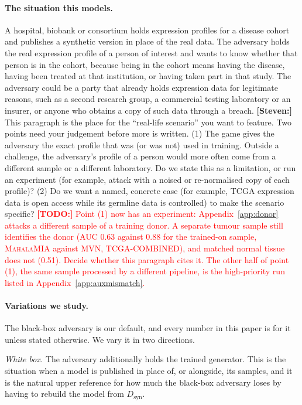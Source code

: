 \documentclass[webpdf,contemporary,large]{oup-authoring-template}
\newif\ifdraft \drafttrue
\newcommand{\annot}[3]{\ifdraft\textcolor{#1}{\textbf{[#2:]} #3}\fi}
\newcommand{\steven}[1]{\annot{Periwinkle}{Steven}{#1}}
\newcommand{\todo}[1]{\annot{red}{TODO}{#1}}
\newcommand{\Dsyn}{D_{\mathrm{syn}}}
\newcommand{\mahala}{\textsc{MahalaMIA}}
\begin{document}
\paragraph{The situation this models.}
A hospital, biobank or consortium holds expression profiles for a disease cohort and publishes a synthetic version in place of the real data. The adversary holds the real expression profile of a person of interest and wants to know whether that person is in the cohort, because being in the cohort means having the disease, having been treated at that institution, or having taken part in that study. The adversary could be a party that already holds expression data for legitimate reasons, such as a second research group, a commercial testing laboratory or an insurer, or anyone who obtains a copy of such data through a breach.
\steven{This paragraph is the place for the ``real-life scenario'' you want to feature. Two points need your judgement before more is written. (1) The game gives the adversary the exact profile that was (or was not) used in training. Outside a challenge, the adversary's profile of a person would more often come from a different sample or a different laboratory. Do we state this as a limitation, or run an experiment (for example, attack with a noised or re-normalised copy of each profile)? (2) Do we want a named, concrete case (for example, TCGA expression data is open access while its germline data is controlled) to make the scenario specific?}
\todo{Point (1) now has an experiment: Appendix~\ref{app:donor} attacks a different sample of a training donor. A separate tumour sample still identifies the donor (AUC 0.63 against 0.88 for the trained-on sample, \mahala{} against MVN, TCGA-COMBINED), and matched normal tissue does not (0.51). Decide whether this paragraph cites it. The other half of point (1), the same sample processed by a different pipeline, is the high-priority run listed in Appendix~\ref{app:auxmismatch}.}

\paragraph{Variations we study.}
The black-box adversary is our default, and every number in this paper is for it unless stated otherwise. We vary it in two directions.

\emph{White box.} The adversary additionally holds the trained generator. This is the situation when a model is published in place of, or alongside, its samples, and it is the natural upper reference for how much the black-box adversary loses by having to rebuild the model from $\Dsyn$.
\end{document}
